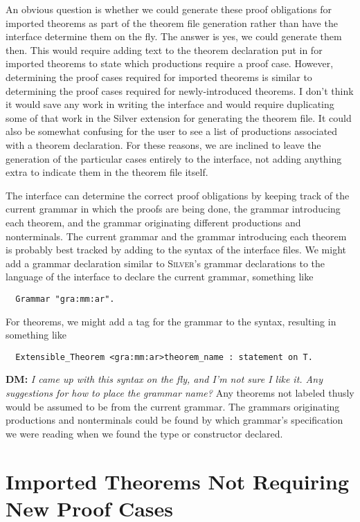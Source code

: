 \documentclass[11pt]{article}
\newcommand{\silver}{\textsc{Silver}}
\newcommand{\dnote}[1]{{\color{orange} \textbf{DM:} \emph{#1}}}
\begin{document}
An obvious question is whether we could generate these proof
obligations for imported theorems as part of the theorem file
generation rather than have the interface determine them on the fly.
The answer is yes, we could generate them then.  This would require
adding text to the theorem declaration put in for imported theorems to
state which productions require a proof case.
%
However, determining the proof cases required for imported theorems is
similar to determining the proof cases required for newly-introduced
theorems.  I don't think it would save any work in writing the
interface and would require duplicating some of that work in the
Silver extension for generating the theorem file.
%
It could also be somewhat confusing for the user to see a list of
productions associated with a theorem declaration.
%
For these reasons, we are inclined to leave the generation of the
particular cases entirely to the interface, not adding anything extra
to indicate them in the theorem file itself.


The interface can determine the correct proof obligations by keeping
track of the current grammar in which the proofs are being done, the
grammar introducing each theorem, and the grammar originating
different productions and nonterminals.
%
The current grammar and the grammar introducing each theorem is
probably best tracked by adding to the syntax of the interface files.
We might add a grammar declaration similar to \silver{}'s grammar
declarations to the language of the interface to declare the current
grammar, something like
\begin{lstlisting}
  Grammar "gra:mm:ar".
\end{lstlisting}
For theorems, we might add a tag for the grammar to the syntax,
resulting in something like
\begin{lstlisting}
  Extensible_Theorem <gra:mm:ar>theorem_name : statement on T.
\end{lstlisting}
\dnote{I came up with this syntax on the fly, and I'm not sure I like
  it.  Any suggestions for how to place the grammar name?}
Any theorems not labeled thusly would be assumed to be from the
current grammar.
%
The grammars originating productions and nonterminals could be found
by which grammar's specification we were reading when we found the
type or constructor declared.





\section{Imported Theorems Not Requiring New Proof Cases}
\end{document}
